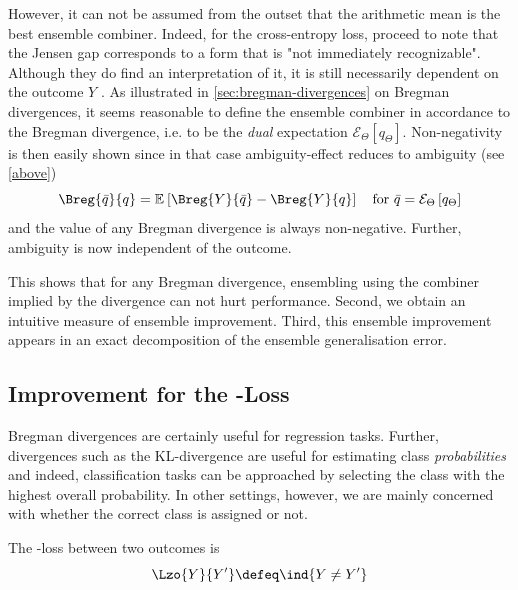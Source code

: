 \documentclass[../main.tex]{subfiles}
\begin{document}
However, it can not be assumed from the outset that the arithmetic mean is the best ensemble combiner. Indeed, for the cross-entropy loss, \citeauthor{abe} proceed to note that the Jensen gap corresponds to a form that is "not immediately recognizable". Although they do find an interpretation of it, it is still necessarily dependent on the outcome $Y$ 
.
As illustrated in \ref{sec:bregman-divergences} on Bregman divergences, 
it seems reasonable to define the ensemble combiner in accordance to the Bregman divergence, i.e. to be the \textit{dual} expectation $\mathcal{E}_{\Theta}\left[ q_{\Theta} \right]$. 
Non-negativity is then easily shown since in that case ambiguity-effect reduces to ambiguity (see \ref{above})
$$
\Breg{\bar{q}}{q} = \mathbb{E}_{}\left[ \Breg{Y}{\bar{q}} - \Breg{Y}{q} \right]
\hspace{1em} \text{for $\bar{q} = \mathcal{E}_\Theta\left[q_\Theta\right]$}
$$ and the value of any Bregman divergence is always non-negative. Further, ambiguity is now independent of the outcome.

This shows that for any Bregman divergence, ensembling using the combiner implied by the divergence can not hurt performance. Second, we obtain an intuitive measure of ensemble improvement. Third, this ensemble improvement appears in an exact decomposition of the ensemble generalisation error.


\subsection{Improvement for the \zeroone-Loss}

Bregman divergences are certainly useful for regression tasks. Further, divergences such as the \textsc{KL}-divergence are useful for estimating class \textit{probabilities} and indeed, classification tasks can be approached by selecting the class with the highest overall probability.
In other settings, however, we are mainly concerned with whether the correct class is assigned or not. 

\begin{definition}
\label{def:zeroone-loss}
The \zeroone-loss between two outcomes is 
$$
\Lzo{Y}{Y'} \defeq \ind{Y \not= Y'}
$$
\end{definition}
\end{document}
